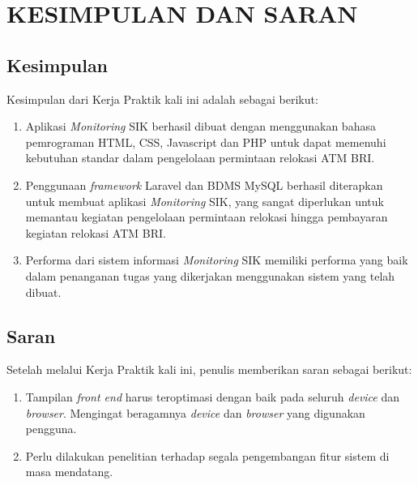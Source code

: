 \chapter{KESIMPULAN DAN SARAN}

\section{Kesimpulan}
Kesimpulan dari Kerja Praktik kali ini adalah sebagai berikut:
\begin{enumerate}
\item Aplikasi \textit{Monitoring} SIK berhasil dibuat dengan menggunakan bahasa pemrograman HTML, CSS, Javascript dan PHP untuk dapat memenuhi kebutuhan standar dalam pengelolaan permintaan relokasi ATM BRI.
\item Penggunaan \textit{framework} Laravel dan BDMS MySQL berhasil diterapkan untuk membuat aplikasi \textit{Monitoring} SIK, yang sangat diperlukan untuk memantau kegiatan pengelolaan permintaan relokasi hingga pembayaran kegiatan relokasi ATM BRI.
\item Performa dari sistem informasi \textit{Monitoring} SIK memiliki performa yang baik dalam penanganan tugas yang dikerjakan menggunakan sistem yang telah dibuat.
\end{enumerate}

\section{Saran}
Setelah melalui Kerja Praktik kali ini, penulis memberikan saran sebagai berikut:
\begin{enumerate}
\item Tampilan \textit{front end} harus teroptimasi dengan baik pada seluruh \textit{device} dan \textit{browser}. Mengingat beragamnya \textit{device} dan \textit{browser} yang digunakan pengguna.
\item Perlu dilakukan penelitian terhadap segala pengembangan fitur sistem di masa mendatang.
\end{enumerate}